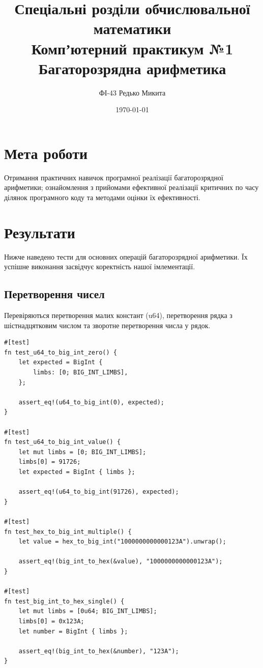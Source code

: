 \documentclass[11pt]{article}
\title{Спеціальні розділи обчислювальної математики\\
Компʼютерний практикум №1\\[1em]
Багаторозрядна арифметика}
\author{ФІ-43 Редько Микита}
\date{\today}
\begin{document}

\maketitle

\section{Мета роботи}
Отримання практичних навичок програмної реалізації багаторозрядної арифметики;
ознайомлення з прийомами ефективної реалізації критичних по часу ділянок
програмного коду та методами оцінки їх ефективності.

\section{Результати}

Нижче наведено тести для основних операцій багаторозрядної арифметики.
Їх успішне виконання засвідчує коректність нашої імлементації.
\subsection{Перетворення чисел}

Перевіряються перетворення малих констант (u64), перетворення рядка з шістнадцятковим числом та зворотне перетворення числа у рядок.

\begin{lstlisting}[style=ruststyle]
#[test]
fn test_u64_to_big_int_zero() {
    let expected = BigInt {
        limbs: [0; BIG_INT_LIMBS],
    };

    assert_eq!(u64_to_big_int(0), expected);
}

#[test]
fn test_u64_to_big_int_value() {
    let mut limbs = [0; BIG_INT_LIMBS];
    limbs[0] = 91726;
    let expected = BigInt { limbs };

    assert_eq!(u64_to_big_int(91726), expected);
}

#[test]
fn test_hex_to_big_int_multiple() {
    let value = hex_to_big_int("1000000000000123A").unwrap();

    assert_eq!(big_int_to_hex(&value), "1000000000000123A");
}

#[test]
fn test_big_int_to_hex_single() {
    let mut limbs = [0u64; BIG_INT_LIMBS];
    limbs[0] = 0x123A;
    let number = BigInt { limbs };

    assert_eq!(big_int_to_hex(&number), "123A");
}
\end{lstlisting}
\end{document}
